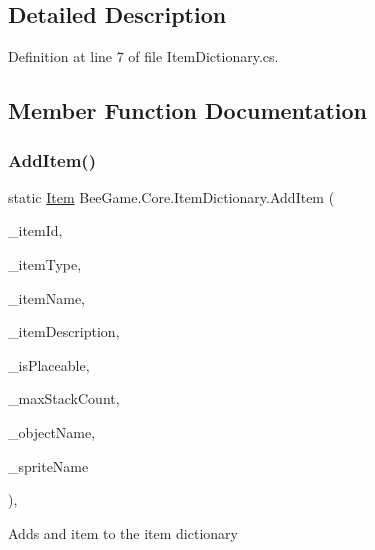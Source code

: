 \subsection{Detailed Description}


Definition at line 7 of file Item\+Dictionary.\+cs.



\subsection{Member Function Documentation}
\mbox{\label{class_bee_game_1_1_core_1_1_item_dictionary_aa74683c6433f643da6967e10862ac026}} 
\subsubsection{\texorpdfstring{Add\+Item()}{AddItem()}}
{\footnotesize\ttfamily static \hyperlink{struct_bee_game_1_1_items_1_1_item}{Item} Bee\+Game.\+Core.\+Item\+Dictionary.\+Add\+Item (\begin{DoxyParamCaption}\item[{string}]{\+\_\+item\+Id,  }\item[{\hyperlink{namespace_bee_game_1_1_enums_aa1fa1a04627915b8e72d3bb1c5c3fa82}{Item\+Type}}]{\+\_\+item\+Type,  }\item[{string}]{\+\_\+item\+Name,  }\item[{string}]{\+\_\+item\+Description,  }\item[{bool}]{\+\_\+is\+Placeable,  }\item[{int}]{\+\_\+max\+Stack\+Count,  }\item[{string}]{\+\_\+object\+Name,  }\item[{string}]{\+\_\+sprite\+Name }\end{DoxyParamCaption})\hspace{0.3cm}{\ttfamily [static]}, {\ttfamily [private]}}



Adds and item to the item dictionary 


